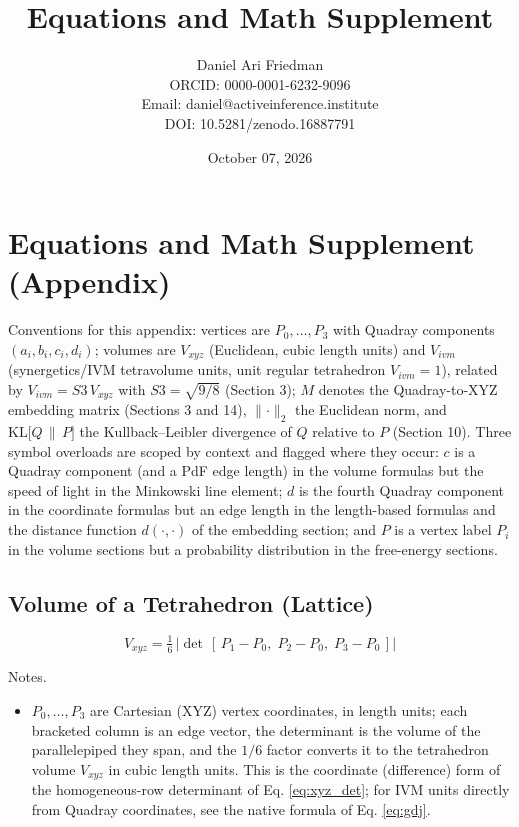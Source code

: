 \documentclass[
  10pt,
]{article}
\title{Equations and Math Supplement}
\author{Daniel Ari Friedman\\ ORCID: 0000-0001-6232-9096\\ Email: daniel@activeinference.institute\\ DOI: 10.5281/zenodo.16887791}
\date{October 07, 2026}
\providecommand{\tightlist}{%
  \setlength{\itemsep}{0pt}\setlength{\parskip}{0pt}}
\begin{document}
\maketitle

{
\hypersetup{linkcolor=black}
\setcounter{tocdepth}{3}
\tableofcontents
}
\section{Equations and Math Supplement
(Appendix)}\label{equations-and-math-supplement-appendix}

Conventions for this appendix: vertices are \(P_0,\ldots,P_3\) with
Quadray components \((a_i, b_i, c_i, d_i)\); volumes are \(V_{xyz}\)
(Euclidean, cubic length units) and \(V_{ivm}\) (synergetics/IVM
tetravolume units, unit regular tetrahedron \(V_{ivm} = 1\)), related by
\(V_{ivm} = S3\,V_{xyz}\) with \(S3=\sqrt{9/8}\) (Section 3); \(M\)
denotes the Quadray-to-XYZ embedding matrix (Sections 3 and 14),
\(\lVert\cdot\rVert_2\) the Euclidean norm, and
\(\mathrm{KL}\big[Q\,\|\,P\big]\) the Kullback--Leibler divergence of
\(Q\) relative to \(P\) (Section 10). Three symbol overloads are scoped
by context and flagged where they occur: \(c\) is a Quadray component
(and a PdF edge length) in the volume formulas but the speed of light in
the Minkowski line element; \(d\) is the fourth Quadray component in the
coordinate formulas but an edge length in the length-based formulas and
the distance function \(d(\cdot,\cdot)\) of the embedding section; and
\(P\) is a vertex label \(P_i\) in the volume sections but a probability
distribution in the free-energy sections.

\subsection{Volume of a Tetrahedron
(Lattice)}\label{volume-of-a-tetrahedron-lattice}

\begin{equation}\label{eq:lattice_det}
V_{xyz} = \tfrac{1}{6}\,\left|\det\,[\,P_1 - P_0,\; P_2 - P_0,\; P_3 - P_0\,]\right|
\end{equation}

Notes.

\begin{itemize}
\tightlist
\item
  \(P_0,\ldots,P_3\) are Cartesian (XYZ) vertex coordinates, in length
  units; each bracketed column is an edge vector, the determinant is the
  volume of the parallelepiped they span, and the \(1/6\) factor
  converts it to the tetrahedron volume \(V_{xyz}\) in cubic length
  units. This is the coordinate (difference) form of the homogeneous-row
  determinant of Eq. \eqref{eq:xyz_det}; for IVM units directly from
  Quadray coordinates, see the native formula of Eq. \eqref{eq:gdj}.
\end{itemize}
\end{document}
